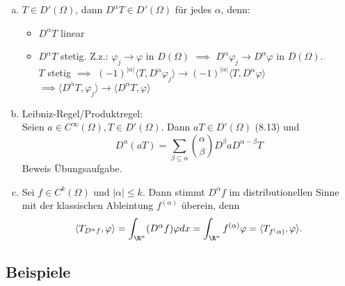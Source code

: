 \begin{enumerate}[a)]
  \item $T \in D'(\Omega)$, dann $D^\alpha T \in D'(\Omega)$ für jedes $\alpha$, denn:
    \begin{itemize}
      \item $D^\alpha T$ linear \checkmark
      \item $D^\alpha T$ stetig. Z.z.: $\varphi_j \to \varphi$ in $D(\Omega)$ $\implies$ $D^\alpha \varphi_j \to D^\alpha \varphi$ in $D(\Omega)$.\\
        $T$ stetig $\implies$ $(-1)^{|\alpha|} \langle T, D^\alpha \varphi_j \rangle \to (-1)^{|\alpha|} \langle T, D^\alpha \varphi \rangle$\\
        $\implies \langle D^\alpha T, \varphi_j \rangle \to \langle D^\alpha T, \varphi \rangle$
    \end{itemize}

  \item Leibniz-Regel/Produktregel:\\
    Seien $a \in C^\infty(\Omega), T \in D'(\Omega)$.
    Dann $aT \in D'(\Omega)$ (8.13) und
    $$
    D^\alpha(aT) = \sum_{\beta \subseteq \alpha} {\alpha\choose\beta} D^\beta a D^{\alpha - \beta} T
    $$
    Beweis Übungsaufgabe.

  \item Sei $f \in C^k(\Omega)$ und $|\alpha| \leq k$.
    Dann stimmt $D^\alpha f$ im distributionellen Sinne mit der klassischen Ableintung $f^{(\alpha)}$ überein, denn
    $$
    \langle T_{D^\alpha f}, \varphi \rangle = \int_{\R^n} (D^\alpha f) \varphi dx = \int_{\R^n} f^{(\alpha)} \varphi =  \langle T_{f^(\alpha)}, \varphi \rangle.
    $$
\end{enumerate}

\subsection{Beispiele}

